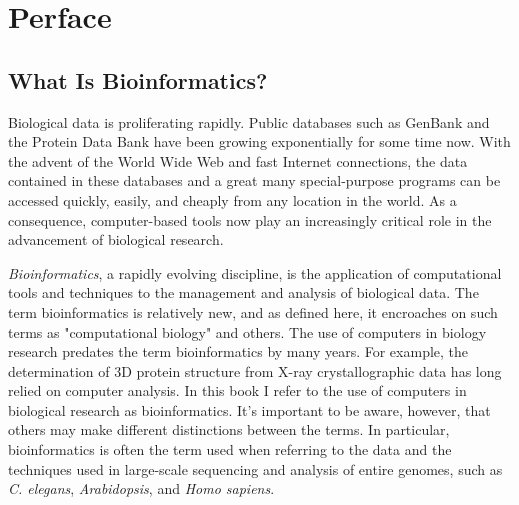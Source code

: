 \setcounter{page}{1}
\chapter*{Perface}

\section*{What Is Bioinformatics?}
Biological data is proliferating rapidly. Public databases such as GenBank and the Protein Data Bank have been growing exponentially for some time now. With the advent of the World Wide Web and fast Internet connections, the data contained in these databases and a great many special-purpose programs can be accessed quickly, easily, and cheaply from any location in the world. As a consequence, computer-based tools now play an increasingly critical role in the advancement of biological research.

\textit{Bioinformatics}, a rapidly evolving discipline, is the application of computational tools and techniques to the management and analysis of biological data. The term bioinformatics is relatively new, and as defined here, it encroaches on such terms as "computational biology" and others. The use of computers in biology research predates the term bioinformatics by many years. For example, the determination of 3D protein structure from X-ray crystallographic data has long relied on computer analysis. In this book I refer to the use of computers in biological research as bioinformatics. It's important to be aware, however, that others may make different distinctions between the terms.  In particular, bioinformatics is often the term used when referring to the data and the techniques used in large-scale sequencing and analysis of entire genomes, such as \textit{C. elegans}, \textit{Arabidopsis}, and \textit{Homo sapiens}.

